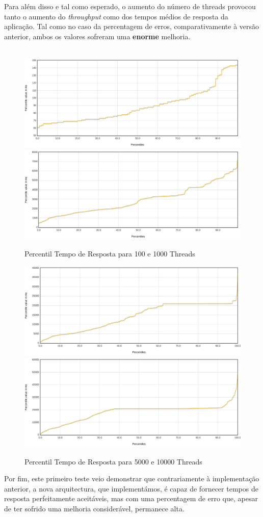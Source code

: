 Para além disso e tal como esperado, o aumento do número de threads provocou tanto o aumento do \textit{throughput} como dos tempos médios de resposta da aplicação. Tal como no caso da percentagem de erros, comparativamente à versão anterior, ambos os valores sofreram uma \textbf{enorme} melhoria.\\
\\

\begin{figure}[ht!]
    \centering
    \includegraphics[width=.45\linewidth]{img/testes/i2-t1-100.png}
    \includegraphics[width=.45\linewidth]{img/testes/i2-t1-1000.png}
    \caption{Percentil Tempo de Resposta para 100 e 1000 Threads}
\end{figure}

\begin{figure}[ht!]
    \centering
    \includegraphics[width=.45\linewidth]{img/testes/i2-t1-5000.png}
    \includegraphics[width=.45\linewidth]{img/testes/i2-t1-10000.png}
    \caption{Percentil Tempo de Resposta para 5000 e 10000 Threads}
\end{figure}

Por fim, este primeiro teste veio demonstrar que contrariamente à implementação anterior, a nova arquitectura, que implementámos, é capaz de fornecer tempos de resposta perfeitamente aceitáveis, mas com uma percentagem de erro que, apesar de ter sofrido uma melhoria considerável, permanece alta.

